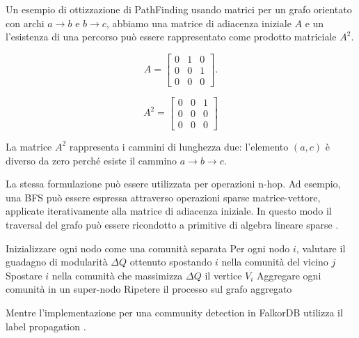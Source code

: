 \documentclass{article}
\begin{document}
Un esempio di ottizzazione di PathFinding usando matrici per %
un grafo orientato con archi $a \to b$ e $b \to c$, abbiamo una matrice di adiacenza %
iniziale $A$ e un l'esistenza di una percorso può essere rappresentato come prodotto matriciale $A^2$. %

$$
A =
\begin{bmatrix}
0 & 1 & 0\\
0 & 0 & 1\\
0 & 0 & 0
\end{bmatrix}.
$$


$$
A^2 =
\begin{bmatrix}
0 & 0 & 1\\
0 & 0 & 0\\
0 & 0 & 0
\end{bmatrix}
$$


La matrice $A^2$ rappresenta i cammini di lunghezza due: 
l'elemento $(a,c)$ è diverso da zero perché esiste il cammino $a \to b \to c$.

La stessa formulazione può essere utilizzata per operazioni n-hop. %
Ad esempio, una BFS può essere espressa attraverso operazioni sparse matrice-vettore, %
applicate iterativamente alla matrice di adiacenza iniziale. In questo modo il traversal del grafo può %
essere ricondotto a primitive di algebra lineare sparse \cite{FalkorDB-doc-theory}.




\begin{algorithm}
\caption{Louvain}
\begin{algorithmic}[1]
    \State Inizializzare ogni nodo come una comunità separata
    \Repeat
        \State Per ogni nodo $i$, valutare il guadagno di modularità $\Delta Q$ 
        \State \quad ottenuto spostando $i$ nella comunità del vicino $j$
        \State Spostare $i$ nella comunità che massimizza $\Delta Q$ il vertice $V_i$
    \State Aggregare ogni comunità in un super-nodo
    \State Ripetere il processo sul grafo aggregato
\EndProcedure
\end{algorithmic}
\end{algorithm}



Mentre l'implementazione per una community detection in FalkorDB utilizza il label %
propagation \cite{Repository-FalkorDB-algo_procedures} . %

\end{document}
